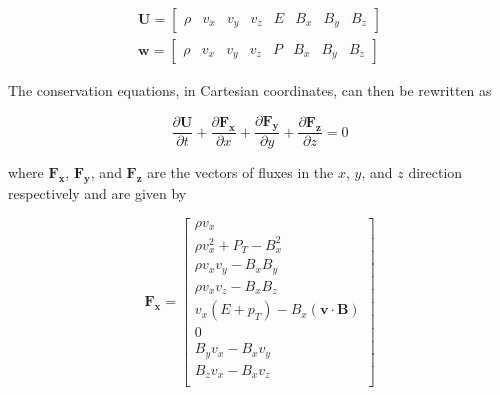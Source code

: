 \begin{align}
    \boldsymbol{U} = \begin{bmatrix}
            \rho &
            v_x &
            v_y &
            v_z &
            E   &
            B_x &
            B_y &
            B_z
         \end{bmatrix}
    \\
    \boldsymbol{w} = \begin{bmatrix}
            \rho &
            v_x &
            v_y &
            v_z &
            P   &
            B_x &
            B_y &
            B_z 
         \end{bmatrix}
\end{align}

The conservation equations, in Cartesian coordinates, can then be rewritten as

\begin{equation}
    \label{eqn:vector-conserved}
    \frac{\partial \boldsymbol{U}}{\partial t} + 
    \frac{\partial \boldsymbol{F_x}}{\partial x} + 
    \frac{\partial \boldsymbol{F_y}}{\partial y} + 
    \frac{\partial \boldsymbol{F_z}}{\partial z} = 0 
\end{equation}

where $\boldsymbol{F_x}$, $\boldsymbol{F_y}$, and $\boldsymbol{F_z}$ are the vectors of fluxes in the $x$, $y$, and $z$ direction respectively and are given by

\begin{equation}
    \boldsymbol{F_x} = \begin{bmatrix}
            \rho v_{x} \\
            \rho v_{x}^2 + P_{T} - B_{x}^2 \\
            \rho v_{x} v_{y} - B_{x} B_{y} \\
            \rho v_{x} v_{z} - B_{x} B_{z} \\
            v_{x} \left( E + p_{T} \right) - B_{x} \left( \boldsymbol{v} \cdot \boldsymbol{B} \right) \\
            0 \\
            B_{y} v_{x} - B_{x} v_{y} \\
            B_{z} v_{x} - B_{x} v_{z} \\
         \end{bmatrix}
\end{equation}

